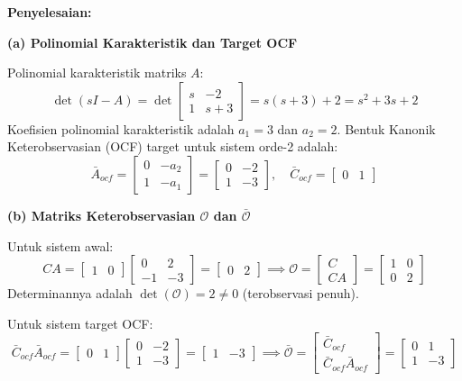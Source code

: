\documentclass[11pt,a4paper]{article}
\begin{document}
\textbf{Penyelesaian:}

\textbf{(a) Polinomial Karakteristik dan Target OCF}

Polinomial karakteristik matriks $A$:
$$\det(sI - A) = \det\begin{bmatrix} s & -2 \\ 1 & s + 3 \end{bmatrix} = s(s + 3) + 2 = s^2 + 3s + 2$$
Koefisien polinomial karakteristik adalah $a_1 = 3$ dan $a_2 = 2$.
Bentuk Kanonik Keterobservasian (OCF) target untuk sistem orde-2 adalah:
$$\bar{A}_{ocf} = \begin{bmatrix} 0 & -a_2 \\ 1 & -a_1 \end{bmatrix} = \begin{bmatrix} 0 & -2 \\ 1 & -3 \end{bmatrix}, \quad \bar{C}_{ocf} = \begin{bmatrix} 0 & 1 \end{bmatrix}$$

\textbf{(b) Matriks Keterobservasian $\mathcal{O}$ dan $\bar{\mathcal{O}}$}

Untuk sistem awal:
$$CA = \begin{bmatrix} 1 & 0 \end{bmatrix} \begin{bmatrix} 0 & 2 \\ -1 & -3 \end{bmatrix} = \begin{bmatrix} 0 & 2 \end{bmatrix} \implies \mathcal{O} = \begin{bmatrix} C \\ CA \end{bmatrix} = \begin{bmatrix} 1 & 0 \\ 0 & 2 \end{bmatrix}$$
Determinannya adalah $\det(\mathcal{O}) = 2 \ne 0$ (terobservasi penuh).

Untuk sistem target OCF:
$$\bar{C}_{ocf} \bar{A}_{ocf} = \begin{bmatrix} 0 & 1 \end{bmatrix} \begin{bmatrix} 0 & -2 \\ 1 & -3 \end{bmatrix} = \begin{bmatrix} 1 & -3 \end{bmatrix} \implies \bar{\mathcal{O}} = \begin{bmatrix} \bar{C}_{ocf} \\ \bar{C}_{ocf}\bar{A}_{ocf} \end{bmatrix} = \begin{bmatrix} 0 & 1 \\ 1 & -3 \end{bmatrix}$$
\end{document}
